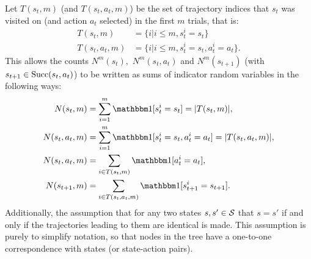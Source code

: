     Let $T(s_t,m)$ (and $T(s_t,a_t,m)$) be the set of trajectory indices that $s_t$ was visited on (and action $a_t$ selected) in the first $m$ trials, that is: 
    \begin{align}
        T(s_t,m) &= \{i | i\leq m, s^i_t = s_t \} \\
        T(s_t,a_t,m) &= \{i | i\leq m, s^i_t = s_t, a^i_t = a_t \}.
    \end{align}
    This allows the counts $N^m(s_t),$ $N^m(s_t,a_t)$ and $N^m(s_{t+1})$ (with $s_{t+1}\in{\textnormal{Succ}(s_t,a_t)}$) to be written as sums of indicator random variables in the following ways:
    \begin{align}
        N(s_t,m) &= \sum_{i=1}^m \one[s^i_t=s_t] = |T(s_t,m)|, \\
        N(s_t,a_t,m) &= \sum_{i=1}^m \one[s^i_t=s_t,a^i_t=a_t] = |T(s_t,a_t,m)|, \\ 
        N(s_t,a_t,m) &= \sum_{i\in T(s_t,m)} \one[a^i_t = a_t], \label{appeq:nsa_sum} \\
        N(s_{t+1},m) &= \sum_{i\in T(s_t,a_t,m)} \one[s^i_{t+1} = s_{t+1}]. \label{appeq:ns_sum}
    \end{align}
    Additionally, the assumption that for any two states $s,s'\in\mathcal{S}$  that $s=s'$ if and only if the trajectories leading to them are identical is made. This assumption is purely to simplify notation, so that nodes in the tree have a one-to-one correspondence with states (or state-action pairs). 
        
        
        
        

